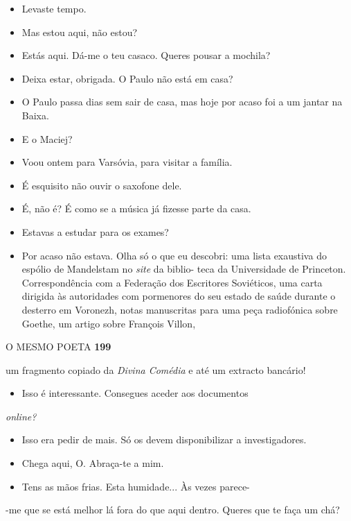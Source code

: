 \begin{itemize}
\tightlist
\item
  Levaste tempo.
\item
  Mas estou aqui, não estou?
\item
  Estás aqui. Dá-me o teu casaco. Queres pousar a mochila?
\item
  Deixa estar, obrigada. O Paulo não está em casa?
\item
  O Paulo passa dias sem sair de casa, mas hoje por acaso foi a um
  jantar na Baixa.
\item
  E o Maciej?
\item
  Voou ontem para Varsóvia, para visitar a família.
\item
  É esquisito não ouvir o saxofone dele.
\item
  É, não é? É como se a música já fizesse parte da casa.
\item
  Estavas a estudar para os exames?
\item
  Por acaso não estava. Olha só o que eu descobri: uma lista exaustiva
  do espólio de Mandelstam no \emph{site }da biblio- teca da
  Universidade de Princeton. Correspondência com a Federação dos
  Escritores Soviéticos, uma carta dirigida às autoridades com
  pormenores do seu estado de saúde durante o desterro em Voronezh,
  notas manuscritas para uma peça radiofónica sobre Goethe, um artigo
  sobre François Villon,
\end{itemize}

O MESMO POETA \textbf{199}

um fragmento copiado da \emph{Divina Comédia }e até um extracto
bancário!

\begin{itemize}
\tightlist
\item
  Isso é interessante. Consegues aceder aos documentos
\end{itemize}

\emph{online?}

\begin{itemize}
\tightlist
\item
  Isso era pedir de mais. Só os devem disponibilizar a investigadores.
\item
  Chega aqui, O. Abraça-te a mim.
\item
  Tens as mãos frias. Esta humidade... Às vezes parece-
\end{itemize}

-me que se está melhor lá fora do que aqui dentro. Queres que te faça um
chá?

